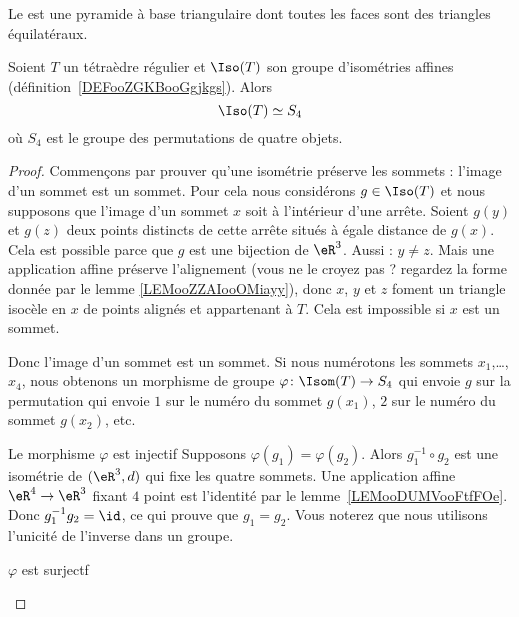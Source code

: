 Le  est une pyramide à base triangulaire dont toutes les faces sont des triangles équilatéraux.

\begin{proposition}       \label{PROPooVNLKooOjQzCj}
    Soient \( T\) un tétraèdre régulier et \( \Iso(T)\) son groupe d'isométries affines (définition~\ref{DEFooZGKBooGgjkgs}). Alors
    \begin{equation}
        \Iso(T)\simeq S_4
    \end{equation}
    où \( S_4\) est le groupe des permutations de quatre objets.
\end{proposition}

\begin{proof}
    Commençons par prouver qu'une isométrie préserve les sommets : l'image d'un sommet est un sommet. Pour cela nous considérons \( g\in \Iso(T)\) et nous supposons que l'image d'un sommet \( x\) soit à l'intérieur d'une arrête. Soient \( g(y)\) et \( g(z)\) deux points distincts de cette arrête situés à égale distance de \( g(x)\). Cela est possible parce que \( g\) est une bijection de \( \eR^3\). Aussi : \( y\neq z\). Mais une application affine préserve l'alignement (vous ne le croyez pas  ? regardez la forme donnée par le lemme \eqref{LEMooZZAIooOMiayy}), donc \( x\), \( y\) et \( z\) foment un triangle isocèle en \( x\) de points alignés et appartenant à \( T\). Cela est impossible si \( x\) est un sommet.

    Donc l'image d'un sommet est un sommet. Si nous numérotons les sommets \( x_1\),\ldots, \( x_4\), nous obtenons un morphisme de groupe \( \varphi\colon \Isom(T) \to S_4\) qui envoie \( g\) sur la permutation qui envoie \( 1\) sur le numéro du sommet \( g(x_1)\), \( 2\) sur le numéro du sommet \( g(x_2)\), etc.

    \begin{subproof}
    \item[Le morphisme \( \varphi\) est injectif]
        Supposons \( \varphi(g_1)=\varphi(g_2)\). Alors \( g_1^{-1}\circ g_2\) est une isométrie de \( (\eR^3,d)\) qui fixe les quatre sommets. Une application affine \( \eR^4\to\eR^3\) fixant \( 4\) point est l'identité par le lemme~\ref{LEMooDUMVooFtfFOe}. Donc \( g_1^{-1}g_2=\id\), ce qui prouve que \( g_1=g_2\). Vous noterez que nous utilisons l'unicité de l'inverse dans un groupe.

    \item[\( \varphi\) est surjectf]


\end{subproof}
\end{proof}
